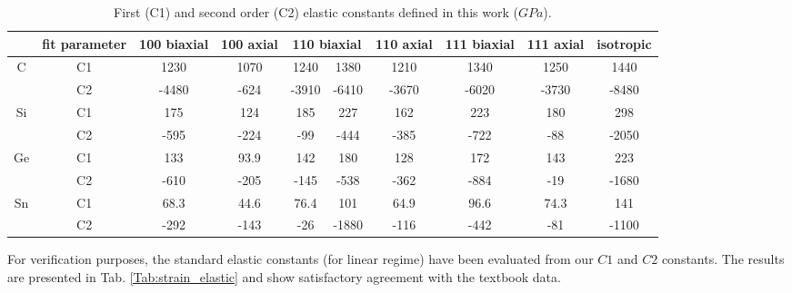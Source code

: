 \begin{table}[!htbp]
    \caption{First (C1) and second order (C2) elastic constants defined in this work ($GPa$).}
    \centering
    \begin{tabular}{|c|c|c|c|c|c|c|c|c|c|}
        \hline
         & fit parameter & 100 biaxial & 100 axial & \multicolumn{2}{c|}{110 biaxial} & 110 axial & 111 biaxial & 111 axial & isotropic \\ \hline
        \multirow{2}{*}{C}  & C1   & 1230  & 1070 & 1240 & 1380 & 1210 & 1340 & 1250 & 1440 \\ \cline{2-10} 
         &  C2   & -4480 & -624 & -3910 & -6410 & -3670  & -6020 & -3730 & -8480   \\ \hline
        \multirow{2}{*}{Si} &  C1   & 175  & 124  & 185  & 227 & 162 &  223  & 180  & 298    \\ \cline{2-10} 
         & C2   & -595 & -224  & -99 & -444 & -385 & -722 & -88 & -2050   \\ \hline
        \multirow{2}{*}{Ge} &  C1   & 133  & 93.9  & 142  & 180 & 128 &  172  & 143  & 223    \\ \cline{2-10} 
         & C2   & -610  & -205  & -145 & -538 & -362 & -884 & -19 & -1680   \\ \hline
        \multirow{2}{*}{Sn} &  C1   & 68.3  & 44.6  & 76.4 & 101 & 64.9  & 96.6   & 74.3  & 141    \\ \cline{2-10} 
         & C2   & -292 & -143  & -26  & -1880 & -116 & -442 & -81  & -1100     \\ \hline
    \end{tabular}
    \label{Tab:strain_pressure}
\end{table}

For verification purposes, the standard elastic constants (for linear regime) have been evaluated from our $C1$ and $C2$ constants.
The results are presented in Tab. \ref{Tab:strain_elastic} and show satisfactory agreement with the textbook data\cite{nsm}.

